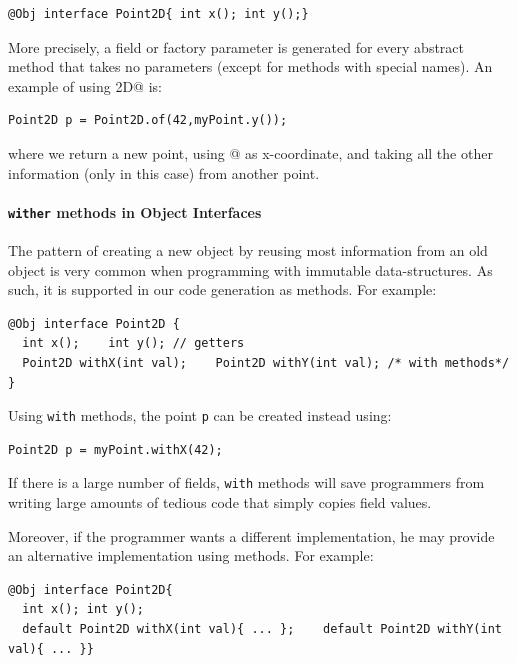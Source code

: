 \begin{lstlisting}
@Obj interface Point2D{ int x(); int y();}
\end{lstlisting}

\noindent More precisely, a field or factory parameter is generated for every
abstract method that takes no parameters (except for methods with special
names). An example of using \Q@Point2D@ is:
\begin{lstlisting}
Point2D p = Point2D.of(42,myPoint.y());
\end{lstlisting}
\noindent where we return a new point, using @ as x-coordinate,
and taking all the other information (only \Q@y@ in this case) from
another point.

\paragraph{\texttt{wither} methods in Object Interfaces}
The pattern of creating a new object by reusing most information from an old
object is very common when programming with immutable
data-structures. As such, it is
supported in our code generation as \Q@with@ methods. For example:
\begin{lstlisting}
@Obj interface Point2D { 
  int x();    int y(); // getters
  Point2D withX(int val);    Point2D withY(int val); /* with methods*/ }
\end{lstlisting}

\noindent Using \texttt{with} methods, the point \texttt{p} can be created instead using:

\begin{lstlisting}
Point2D p = myPoint.withX(42);
\end{lstlisting}

\noindent If there is a large number of fields, \texttt{with} methods
will save programmers from writing large amounts of tedious code that
simply copies field values. 

Moreover, if the programmer wants a different implementation, he may 
provide an alternative implementation using \Q@default@ methods. For example:
\begin{lstlisting}
@Obj interface Point2D{ 
  int x(); int y();
  default Point2D withX(int val){ ... };    default Point2D withY(int val){ ... }}
\end{lstlisting}

